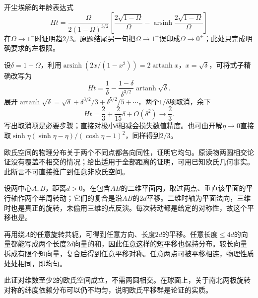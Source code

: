 \begin{exercise}
开尘埃解的年龄表达式
\[
 Ht=\frac{\Omega}{2(1-\Omega)^{3/2}}
 \left[\frac{2\sqrt{1-\Omega}}{\Omega}
 -\operatorname{arsinh}\frac{2\sqrt{1-\Omega}}{\Omega}\right]
\]
在$\Omega\to1^-$时证明趋$2/3$。原题结尾另一句把$\Omega\to1^+$误印成$\Omega\to0^+$；此处只完成明确要求的左极限。
\end{exercise}
\begin{solution}
设$\delta=1-\Omega$，利用$\operatorname{arsinh}(2x/(1-x^2))=2\operatorname{artanh}x$，$x=\sqrt\delta$，可将式子精确改写为
\[
 Ht=\frac1\delta-\frac{1-\delta}{\delta^{3/2}}\operatorname{artanh}\sqrt\delta.
\]
展开$\operatorname{artanh}\sqrt\delta=\sqrt\delta+\delta^{3/2}/3+\delta^{5/2}/5+\cdots$，两个$1/\delta$项取消，余下
\[
 Ht=\frac23+\frac{2}{15}\delta+O(\delta^2)\longrightarrow\frac23.
\]
写出取消项是必要步骤；直接对极小$\delta$相减会损失数值精度。也可由开解$\eta\to0$直接取$\sinh\eta(\sinh\eta-\eta)/(\cosh\eta-1)^2$，同样得到$2/3$。
\end{solution}

\begin{exercise}
欧氏空间的物理分布关于两个不同点都各向同性，证明它均匀。原读物两圆相交论证没有覆盖不相交的情况；给出适用于全部距离的证明，可用已知欧氏几何事实。此断言不可直接推广到任意非欧氏空间。
\end{exercise}
\begin{solution}
设两中心$A,B$，距离$d>0$。在包含$AB$的二维平面内，取过两点、垂直该平面的平行轴作两个半周转动；它们的复合是沿$AB$的$2d$平移。二维时轴为平面法向，三维时也是真正的旋转，未偷用三维的点反演。每次转动都是给定的对称性，故这个平移也是。

再用绕$A$的任意旋转共轭，可得到任意方向、长度$2d$的平移。任意长度$\le4d$的向量都能写成两个长度$2d$向量的和，因此任意这样的短平移也保持分布。较长向量拆成有限个短向量，复合后得到任意平移对称。任意两点可被平移相连，物理性质处处相同，即均匀。

此证对维数至少2的欧氏空间成立，不需两圆相交。在球面上，关于南北两极旋转对称的纬度依赖分布可以仍不均匀，说明欧氏平移群是论证的实质。
\end{solution}
